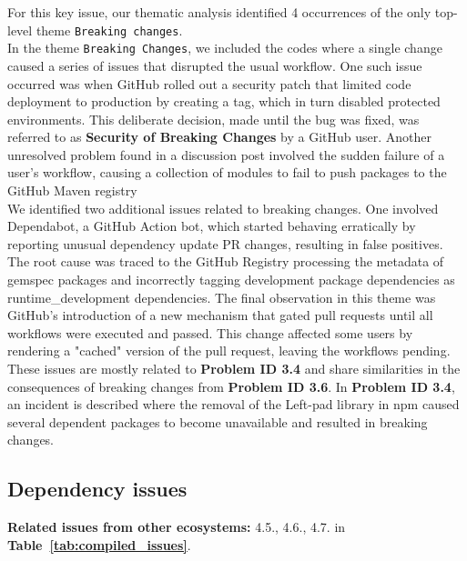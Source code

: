 \documentclass[conference]{IEEEtran}
\begin{document}
	For this key issue, our thematic analysis identified 4 occurrences of the only  top-level theme \texttt{Breaking changes}.\\
In the theme \texttt{Breaking Changes}, we included the codes where a single change caused a series of issues that disrupted the usual workflow. One such issue occurred was when GitHub rolled out a security patch that limited code deployment to production by creating a tag, which in turn disabled protected environments. This deliberate decision, made until the bug was fixed, was referred to as \textbf{Security of Breaking Changes} by a GitHub user. Another unresolved problem found in a discussion post involved the sudden failure of a user's workflow, causing a collection of modules to fail to push packages to the GitHub Maven registry\\
	We identified two additional issues related to breaking changes. One involved Dependabot, a GitHub Action bot, which started behaving erratically by reporting unusual dependency update PR changes, resulting in false positives. The root cause was traced to the GitHub Registry processing the metadata of gemspec packages and incorrectly tagging development package dependencies as runtime\_development dependencies. The final observation in this theme was GitHub's introduction of a new mechanism that gated pull requests until all workflows were executed and passed. This change affected some users by rendering a "cached" version of the pull request, leaving the workflows pending.\\
	These issues are mostly related to \textbf{Problem ID 3.4} and share similarities in the consequences of breaking changes from \textbf{Problem ID 3.6}. In \textbf{Problem ID 3.4}, an incident is described where the removal of the Left-pad library in npm caused several dependent packages to become unavailable and resulted in breaking changes.
\subsection*{\textbf{Dependency issues}}
\textbf{Related issues from other ecosystems:} 4.5., 4.6., 4.7. in \textbf{Table~\ref{tab:compiled_issues}}.\\
\end{document}
